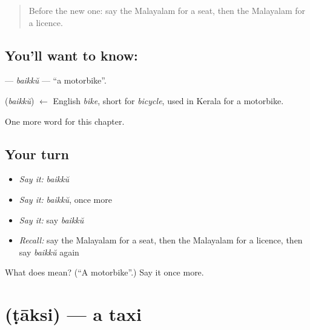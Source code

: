 \label{lesson:ML-C210-baikku}



\begin{quote}
Before the new one: say the Malayalam for a seat, then the Malayalam for a licence.
\end{quote}

\subsection*{You'll want to know: }
\textbf{} — \emph{baikkŭ} — \textquotedblleft{}a motorbike\textquotedblright{}.

\begin{cousinweb}
\textbf{} (\emph{baikkŭ}) $\leftarrow$ English \emph{bike}, short for \emph{bicycle}, used in Kerala for a motorbike.
\end{cousinweb}

\begin{grammarlens}[title={What you've built}]
One more word for this chapter.
\end{grammarlens}

\subsection*{Your turn}
\begin{itemize}
\raggedright
  \item \emph{Say it:} \emph{baikkŭ}
  \item \emph{Say it:} \emph{baikkŭ}, once more
  \item \emph{Say it:} say \emph{baikkŭ}
  \item \emph{Recall:} say the Malayalam for a seat, then the Malayalam for a licence, then say \emph{baikkŭ} again
\end{itemize}

\begin{tcolorbox}[breakable,colback=teal!4,colframe=teal!35!black,title={Before you move on}]
What does  mean? (\textquotedblleft{}A motorbike\textquotedblright{}.) Say it once more.
\end{tcolorbox}
\section[\texorpdfstring{\ml{ടാക്സി} (ṭāksi)}{ടാക്സി (ṭāksi)}]{ (ṭāksi) — a taxi}

\label{lesson:ML-C210-taksi}



